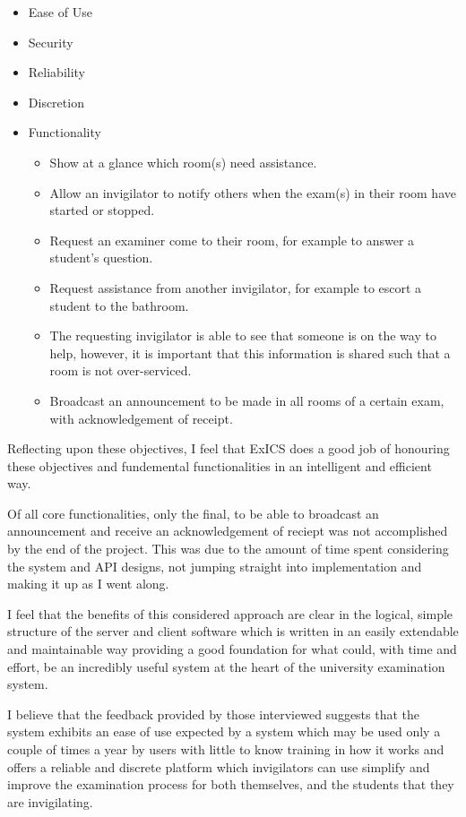 \begin{itemize}
\item Ease of Use\\
\item Security\\
\item Reliability\\
\item Discretion\\
\item Functionality\\
\begin{itemize}
\item Show at a glance which room(s) need assistance.
\item Allow an invigilator to notify others when the exam(s) in their room have started or stopped.
\item Request an examiner come to their room, for example to answer a student's question.
\item Request assistance from another invigilator, for example to escort a student to the bathroom.
\item The requesting invigilator is able to see that someone is on the way to help, however, it is important that this information is shared such that a room is not over-serviced.
\item Broadcast an announcement to be made in all rooms of a certain exam, with acknowledgement of receipt.
\end{itemize}
\end{itemize}

Reflecting upon these objectives, I feel that ExICS does a good job of honouring these objectives and fundemental functionalities in an intelligent and efficient way.

Of all core functionalities, only the final, to be able to broadcast an announcement and receive an acknowledgement of reciept was not accomplished by the end of the project.  This was due to the amount of time spent considering the system and API designs, not jumping straight into implementation and making it up as I went along.

I feel that the benefits of this considered approach are clear in the logical, simple structure of the server and client software which is written in an easily extendable and maintainable way providing a good foundation for what could, with time and effort, be an incredibly useful system at the heart of the university examination system.

I believe that the feedback provided by those interviewed suggests that the system exhibits an ease of use expected by a system which may be used only a couple of times a year by users with little to know training in how it works and offers a reliable and discrete platform which invigilators can use simplify and improve the examination process for both themselves, and the students that they are invigilating.